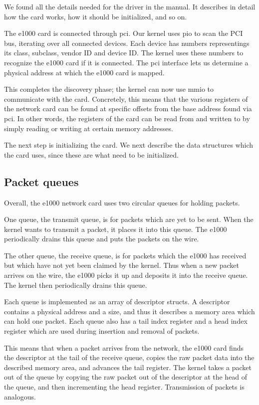\documentclass{article}
\begin{document}
We found all the details needed for the driver in the manual. It describes in
detail how the card works, how it should be initialized, and so on.

The e1000 card is connected through \gls{pci}. Our kernel uses \gls{pio} to
scan the PCI bus, iterating over all connected devices. Each device has
numbers representings its class, subclass, vendor ID and device ID. The kernel
uses these numbers to recognize the e1000 card if it is connected. The
\gls{pci} interface lets us determine a physical address at which the e1000
card is mapped. 

This completes the discovery phase; the kernel can now use \gls{mmio} to
communicate with the card. Concretely, this means that the various registers
of the network card can be found at specific offsets from the base address
found via \gls{pci}. In other words, the registers of the card can be read
from and written to by simply reading or writing at certain memory addresses.

The next step is initializing the card. We next describe the data structures
which the card uses, since these are what need to be initialized.

\subsection{Packet queues}
Overall, the e1000 network card uses two circular queues for holding packets.

One queue, the transmit queue, is for packets which are yet to be sent. When
the kernel wants to transmit a packet, it places it into this queue. The e1000
periodically drains this queue and puts the packets on the wire.

The other queue, the receive queue, is for packets which the e1000 has
received but which have not yet been claimed by the kernel. Thus when a new
packet arrives on the wire, the e1000 picks it up and deposits it into the
receive queue. The kernel then periodically drains this queue.

Each queue is implemented as an array of descriptor structs. A descriptor
contains a physical address and a size, and thus it describes a memory area
which can hold one packet. Each queue also has a tail index register and a
head index register which are used during insertion and removal of packets.

This means that when a packet arrives from the network, the e1000 card finds
the descriptor at the tail of the receive queue, copies the raw packet data
into the described memory area, and advances the tail register. The kernel
takes a packet out of the queue by copying the raw packet out of the
descriptor at the head of the queue, and then incrementing the head register.
Transmission of packets is analogous.
\end{document}
